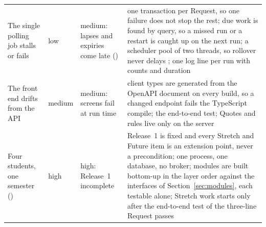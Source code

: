 {\begin{longtable}{@{}L{0.2\textwidth}L{0.07\textwidth}L{0.15\textwidth}L{\tabcolsep\relax}@{}}
The single polling job stalls or fails & low & medium: lapses and expiries come late () & one transaction per Request, so one failure does not stop the rest; due work is found by query, so a missed run or a restart is caught up on the next run; a scheduler pool of two threads, so rollover never delays ; one log line per run with counts and duration \\
The front end drifts from the API & medium & medium: screens fail at run time & client types are generated from the OpenAPI document on every build, so a changed endpoint fails the TypeScript compile; the end-to-end test; Quotes and rules live only on the server \\
Four students, one semester () & high & high: Release~1 incomplete & Release~1 is fixed and every Stretch and Future item is an extension point, never a precondition; one process, one database, no broker; modules are built bottom-up in the layer order against the interfaces of Section~\ref{sec:modules}, each testable alone; Stretch work starts only after the end-to-end test of the three-line Request passes \\
\end{longtable}
}
